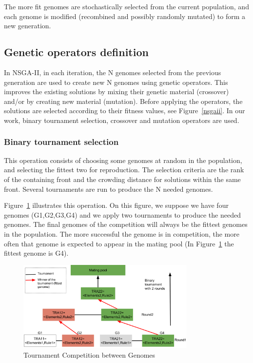 \documentclass[conference]{IEEEtran}
\begin{document}
The more fit genomes are stochastically selected from the current population, and each genome is modified (recombined and possibly randomly mutated) to form a new generation.

\subsection{Genetic operators definition}
In NSGA-II, in each iteration, the N genomes selected from the previous generation are used to create new N genomes using genetic operators. This improves the existing solutions by mixing their genetic material (crossover) and/or by creating new material (mutation). Before applying the operators, the solutions are selected according to their fitness values, see Figure~\ref{nsgaii}. In our work, binary tournament selection, crossover and mutation operators are used.

\subsubsection{\textbf{Binary tournament selection}}
This operation consists of choosing some genomes at random in the population, and selecting the fittest two for reproduction. The selection criteria are the rank of the containing front and the crowding distance for solutions within the same front. Several tournaments are run to produce the N needed genomes.

Figure~\ref{binary} illustrates this operation. On this figure, we suppose we have four genomes (G1,G2,G3,G4) and we apply two tournaments to produce the needed genomes. The final genomes of the competition will always be the fittest genomes in the population. The more successful the genome is in competition, the more often that genome is expected to appear in the mating pool (In Figure~\ref{binary} the fittest genome is G4).

\begin{figure}[!t]
\centering
\includegraphics[width=3.49in]{bt.pdf}
\caption{Tournament Competition between Genomes}
\label{binary}
\end{figure}
\end{document}
